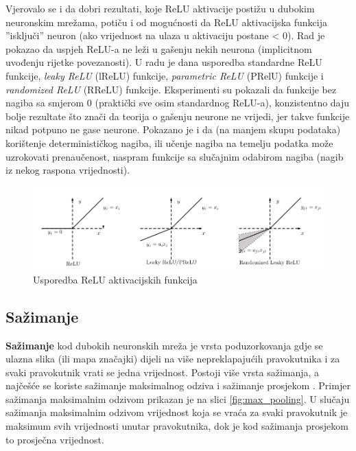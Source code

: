 \documentclass[times, utf8, diplomski, numeric]{fer}
\begin{document}
Vjerovalo se i da dobri rezultati, koje ReLU aktivacije postižu u dubokim neuronskim mrežama, potiču i od mogućnosti da ReLU aktivacijska funkcija ''isključi'' neuron (ako vrijednost na ulaza u aktivaciju postane < 0). Rad \cite{xu2015empirical} je pokazao da uspjeh ReLU-a ne leži u gašenju nekih neurona (implicitnom uvođenju rijetke povezanosti). U radu je dana usporedba standardne ReLU funkcije, \emph{leaky ReLU} (lReLU) funkcije, \emph{parametric ReLU} (PRelU) funkcije i \emph{randomized ReLU} (RReLU) funkcije. Eksperimenti su pokazali da funkcije bez nagiba sa smjerom 0 (praktički sve osim standardnog ReLU-a), konzistentno daju bolje rezultate što znači da teorija o gašenju neurone ne vrijedi, jer takve funkcije nikad potpuno ne gase neurone. Pokazano je i da (na manjem skupu podataka) korištenje determinističkog nagiba, ili učenje nagiba na temelju podatka može uzrokovati prenaučenost, naspram funkcije sa slučajnim odabirom nagiba (nagib iz nekog raspona vrijednosti).

\begin{figure}[htb]
\centering
\includegraphics[width=\textwidth]{imgs/relus.png}
\caption{Usporedba ReLU aktivacijskih funkcija}
\label{fig:relu_plot}
\end{figure}

\subsection{Sažimanje}

\textbf{Sažimanje} kod dubokih neuronskih mreža je vrsta poduzorkovanja gdje se ulazna slika (ili mapa značajki) dijeli na više nepreklapajućih pravokutnika i za svaki pravokutnik vrati se jedna vrijednost. Postoji više vrsta sažimanja, a najčešće se koriste sažimanje maksimalnog odziva  i sažimanje prosjekom . Primjer sažimanja maksimalnim odzivom prikazan je na slici \ref{fig:max_pooling}.
U slučaju sažimanja maksimalnim odzivom vrijednost koja se vraća za svaki pravokutnik je maksimum svih vrijednosti unutar pravokutnika, dok je kod sažimanja prosjekom to prosječna vrijednost.
\end{document}
